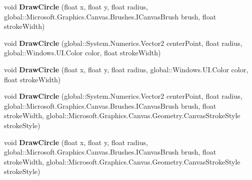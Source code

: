 \begin{DoxyCompactItemize}
\mbox{\label{class_microsoft_1_1_graphics_1_1_canvas_1_1_canvas_drawing_session_a5e93f017906856d7261ece2c0c017679}} 
void {\bfseries Draw\+Circle} (float x, float y, float radius, global\+::\+Microsoft.\+Graphics.\+Canvas.\+Brushes.\+I\+Canvas\+Brush brush, float stroke\+Width)
\item 
\mbox{\label{class_microsoft_1_1_graphics_1_1_canvas_1_1_canvas_drawing_session_a84a70b9c50b68b7c5f874112da8acaa4}} 
void {\bfseries Draw\+Circle} (global\+::\+System.\+Numerics.\+Vector2 center\+Point, float radius, global\+::\+Windows.\+U\+I.\+Color color, float stroke\+Width)
\item 
\mbox{\label{class_microsoft_1_1_graphics_1_1_canvas_1_1_canvas_drawing_session_a495a425c73d550076f84dfa13f91483d}} 
void {\bfseries Draw\+Circle} (float x, float y, float radius, global\+::\+Windows.\+U\+I.\+Color color, float stroke\+Width)
\item 
\mbox{\label{class_microsoft_1_1_graphics_1_1_canvas_1_1_canvas_drawing_session_a7253ab91f4de1b7b8a1ea35869259db2}} 
void {\bfseries Draw\+Circle} (global\+::\+System.\+Numerics.\+Vector2 center\+Point, float radius, global\+::\+Microsoft.\+Graphics.\+Canvas.\+Brushes.\+I\+Canvas\+Brush brush, float stroke\+Width, global\+::\+Microsoft.\+Graphics.\+Canvas.\+Geometry.\+Canvas\+Stroke\+Style stroke\+Style)
\item 
\mbox{\label{class_microsoft_1_1_graphics_1_1_canvas_1_1_canvas_drawing_session_a824c2ca0465674a6ae0c468c0e7b1db3}} 
void {\bfseries Draw\+Circle} (float x, float y, float radius, global\+::\+Microsoft.\+Graphics.\+Canvas.\+Brushes.\+I\+Canvas\+Brush brush, float stroke\+Width, global\+::\+Microsoft.\+Graphics.\+Canvas.\+Geometry.\+Canvas\+Stroke\+Style stroke\+Style)
\item 
\mbox{\label{class_microsoft_1_1_graphics_1_1_canvas_1_1_canvas_drawing_session_aed7e798b251107e311a60692a765c119}} 

\end{DoxyCompactItemize}
